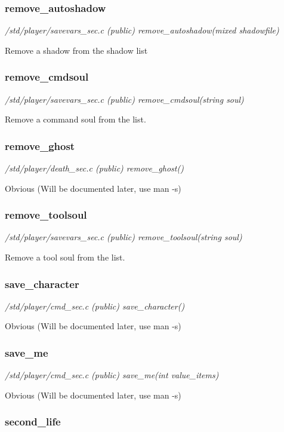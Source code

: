 \subsubsection{remove\_autoshadow}

{\em /std/player/savevars\_sec.c (public) remove\_autoshadow(mixed shadowfile)}

Remove a shadow from the shadow list


\subsubsection{remove\_cmdsoul}

{\em /std/player/savevars\_sec.c (public) remove\_cmdsoul(string soul)}

Remove a command soul from the list.


\subsubsection{remove\_ghost}

{\em /std/player/death\_sec.c (public) remove\_ghost()}

Obvious (Will be documented later, use man -s)


\subsubsection{remove\_toolsoul}

{\em /std/player/savevars\_sec.c (public) remove\_toolsoul(string soul)}

Remove a tool soul from the list.


\subsubsection{save\_character}

{\em /std/player/cmd\_sec.c (public) save\_character()}

Obvious (Will be documented later, use man -s)


\subsubsection{save\_me}

{\em /std/player/cmd\_sec.c (public) save\_me(int value\_items)}

Obvious (Will be documented later, use man -s)


\subsubsection{second\_life}

